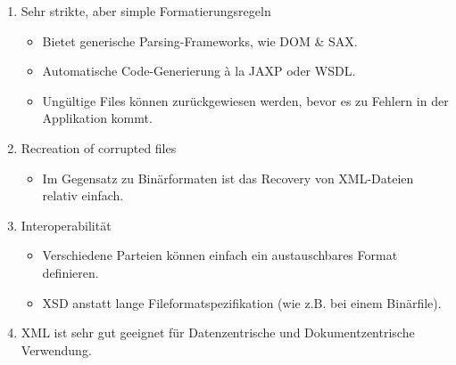 \begin{enumerate}
\item Sehr strikte, aber simple Formatierungsregeln
\begin{itemize}
\item Bietet generische Parsing-Frameworks, wie DOM \& SAX.
\item Automatische Code-Generierung à la JAXP oder WSDL.
\item Ungültige Files können zurückgewiesen werden, bevor es zu Fehlern in der Applikation kommt.
\end{itemize}
\item Recreation of corrupted files
\begin{itemize}
\item Im Gegensatz zu Binärformaten ist das Recovery von XML-Dateien relativ einfach.
\end{itemize}
\item Interoperabilität
\begin{itemize}
\item Verschiedene Parteien können einfach ein austauschbares Format definieren.
\item XSD anstatt lange Fileformatspezifikation (wie z.B. bei einem Binärfile).
\end{itemize}
\item XML ist sehr gut geeignet für Datenzentrische und Dokumentzentrische Verwendung.
\end{enumerate}
